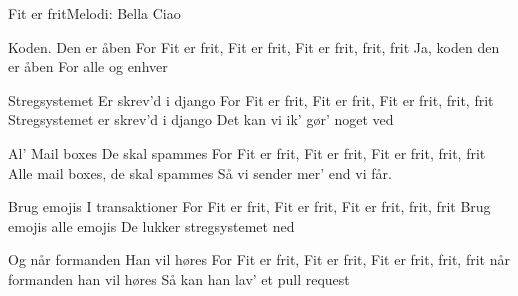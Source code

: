 \begin{sang}{Fit er frit}{Melodi: Bella Ciao}
\begin{vers}
Koden.
Den er åben
For Fit er frit, Fit er frit, Fit er frit, frit, frit
Ja, koden den er åben
For alle og enhver 
\end{vers}
\begin{vers}
Stregsystemet
Er skrev’d i django
For Fit er frit, Fit er frit, Fit er frit, frit, frit
Stregsystemet er skrev’d i django
Det kan vi ik’ gør’ noget ved 
\end{vers}
\begin{vers}
Al’ Mail boxes
De skal spammes
For Fit er frit, Fit er frit, Fit er frit, frit, frit
Alle mail boxes, de skal spammes
Så vi sender mer’ end vi får.
\end{vers}
\begin{vers}
Brug emojis
I transaktioner
For Fit er frit, Fit er frit, Fit er frit, frit, frit
Brug emojis alle emojis
De lukker stregsystemet ned 
\end{vers}
\begin{vers}
Og når formanden
Han vil høres
For Fit er frit, Fit er frit, Fit er frit, frit, frit
når formanden han vil høres
Så kan han lav’ et pull request 
\end{vers}
\vbox{}\vfill
\laps
\end{sang}
